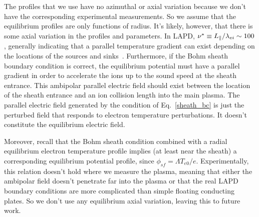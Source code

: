 The profiles that we use have no azimuthal or axial variation because we don't have the corresponding experimental measurements. So we assume that the equilibrium profiles are only functions
of radius. It's likely, however, that there is some axial variation in the profiles and parameters. In LAPD, $\nu^* \equiv L_\parallel/\lambda_{ei} \sim 100$, generally indicating that a
parallel temperature gradient can exist depending on the locations of the sources and sinks~\cite{stangeby2000}. 
Furthermore, if the Bohm sheath boundary condition is correct, the equilibrium potential must have a parallel gradient in order
to accelerate the ions up to the sound speed at the sheath entrance. This ambipolar parallel electric field should exist between the location of the sheath entrance and an ion collision length
into the main plasma. The parallel electric field generated by the condition of Eq.~\ref{sheath_bc} is just the perturbed field that responds to electron temperature perturbations. It doesn't
constitute the equilibrium electric field. 

Moreover, recall that the Bohm sheath condition combined with a radial equilibrium electron temperature profile implies (at least near the sheath) a corresponding equilibrium potential profile, since 
$\phi_{sf} = \Lambda T_{e0} / e$. Experimentally, this relation doesn't hold where we measure the plasma, meaning that either the ambipolar field doesn't penetrate far into the plasma or that
the real LAPD boundary conditions are more complicated than simple floating conducting plates. So we don't use any equilibrium axial variation, leaving this to future work.



